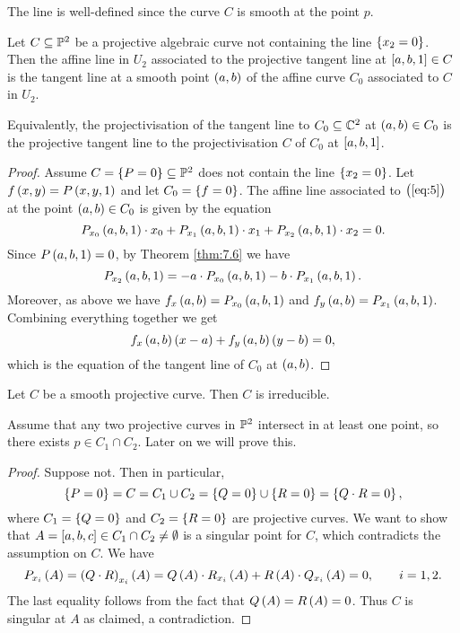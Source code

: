 \begin{note*}
The line is well-defined since the curve $ C $ is smooth at the point $ p $.
\end{note*}

\begin{proposition}
Let $ C \subseteq \mathbb{P}^2 $ be a projective algebraic curve not containing the line $ \cbr{x_2 = 0} $. Then the affine line in $ U_2 $ associated to the projective tangent line at $ \sbr{a, b, 1} \in C $ is the tangent line at a smooth point $ \br{a, b} $ of the affine curve $ C_0 $ associated to $ C $ in $ U_2 $.
\end{proposition}

Equivalently, the projectivisation of the tangent line to $ C_0 \subseteq \mathbb{C}^2 $ at $ \br{a, b} \in C_0 $ is the projective tangent line to the projectivisation $ C $ of $ C_0 $ at $ \sbr{a, b, 1} $.

\pagebreak

\begin{proof}
Assume $ C = \cbr{P = 0} \subseteq \PP^2 $ does not contain the line $ \cbr{x_2 = 0} $. Let $ f\br{x, y} = P\br{x, y, 1} $ and let $ C_0 = \cbr{f = 0} $. The affine line associated to $ \br{\ref{eq:5}} $ at the point $ \br{a, b} \in C_0 $ is given by the equation
$$ P_{x_0}\br{a, b, 1} \cdot x_0 + P_{x_1}\br{a, b, 1} \cdot x_1 + P_{x_2}\br{a, b, 1} \cdot x_2 = 0. $$
Since $ P\br{a, b, 1} = 0 $, by Theorem \ref{thm:7.6} we have
$$ P_{x_2}\br{a, b, 1} = -a \cdot P_{x_0}\br{a, b, 1} - b \cdot P_{x_1}\br{a, b, 1}. $$
Moreover, as above we have $ f_x\br{a, b} = P_{x_0}\br{a, b, 1} $ and $ f_y\br{a, b} = P_{x_1}\br{a, b, 1} $. Combining everything together we get
$$ f_x\br{a, b}\br{x - a} + f_y\br{a, b}\br{y - b} = 0, $$
which is the equation of the tangent line of $ C_0 $ at $ \br{a, b} $.
\end{proof}

\begin{theorem}
\label{thm:7.9}
Let $ C $ be a smooth projective curve. Then $ C $ is irreducible.
\end{theorem}

Assume that any two projective curves in $ \mathbb{P}^2 $ intersect in at least one point, so there exists $ p \in C_1 \cap C_2 $. Later on we will prove this.

\begin{proof}
Suppose not. Then in particular,
$$ \cbr{P = 0} = C = C_1 \cup C_2 = \cbr{Q = 0} \cup \cbr{R = 0} = \cbr{Q \cdot R = 0}, $$
where $ C_1 = \cbr{Q = 0} $ and $ C_2 = \cbr{R = 0} $ are projective curves. We want to show that $ A = \sbr{a, b, c} \in C_1 \cap C_2 \ne \emptyset $ is a singular point for $ C $, which contradicts the assumption on $ C $. We have
$$ P_{x_i}\br{A} = \br{Q \cdot R}_{x_i}\br{A} = Q\br{A} \cdot R_{x_i}\br{A} + R\br{A} \cdot Q_{x_i}\br{A} = 0, \qquad i = 1, 2. $$
The last equality follows from the fact that $ Q\br{A} = R\br{A} = 0 $. Thus $ C $ is singular at $ A $ as claimed, a contradiction.
\end{proof}

